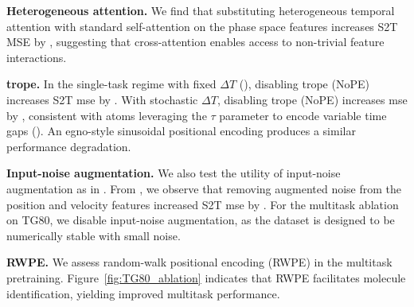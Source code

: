 \textbf{Heterogeneous attention.} We find that substituting heterogeneous temporal attention with standard self-attention on the phase space features increases S2T MSE by \CrossAttvsStdAtt{}, suggesting that cross-attention enables access to non-trivial feature interactions.


\textbf{\gls{trope}.} 
In the single-task regime with fixed $\Delta T$ (), disabling \gls{trope} (NoPE) increases S2T \gls{mse} by \NoPEvsDefaultST{}. With stochastic $\Delta T$, disabling \gls{trope} (NoPE) increases \gls{mse} by \NoPEvsDefault{}, consistent with \gls{atoms} leveraging the \(\tau\) parameter to encode  variable time gaps ().  An \gls{egno}-style sinusoidal positional encoding produces a similar performance degradation.



\textbf{Input-noise augmentation.}
We also test the utility of input-noise augmentation as in . From , we observe that removing augmented noise from the position and velocity features increased S2T \gls{mse} by \NoNoisevsDefault{}. For the multitask ablation on TG80, we disable input-noise augmentation, as the dataset is designed to be numerically stable with small noise.

\textbf{RWPE.} We assess random-walk positional encoding (RWPE) in the multitask pretraining. Figure~\ref{fig:TG80_ablation} indicates that RWPE facilitates molecule identification, yielding improved multitask performance.


